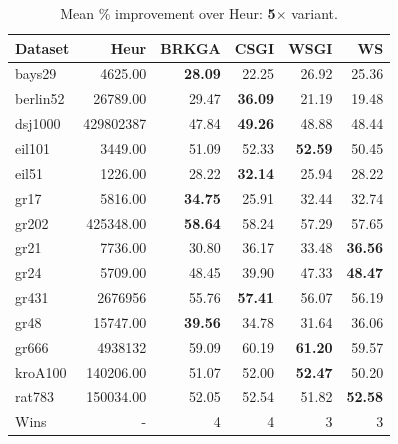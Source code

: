 \documentclass[sigconf]{acmart}
\begin{document}
\begin{table}[t]
\centering
\caption{Mean \% improvement over Heur: \textbf{5$\times$} variant.}
\label{tab:5x}
\small
\begin{tabular}{lrrrrr}
\toprule
Dataset & Heur & BRKGA & CSGI & WSGI & WS \\
\midrule
bays29 & 4625.00 & \textbf{28.09} & 22.25 & 26.92 & 25.36 \\
berlin52 & 26789.00 & 29.47 & \textbf{36.09} & 21.19 & 19.48 \\
dsj1000 & 429802387 & 47.84 & \textbf{49.26} & 48.88 & 48.44 \\
eil101 & 3449.00 & 51.09 & 52.33 & \textbf{52.59} & 50.45 \\
eil51 & 1226.00 & 28.22 & \textbf{32.14} & 25.94 & 28.22 \\
gr17 & 5816.00 & \textbf{34.75} & 25.91 & 32.44 & 32.74 \\
gr202 & 425348.00 & \textbf{58.64} & 58.24 & 57.29 & 57.65 \\
gr21 & 7736.00 & 30.80 & 36.17 & 33.48 & \textbf{36.56} \\
gr24 & 5709.00 & 48.45 & 39.90 & 47.33 & \textbf{48.47} \\
gr431 & 2676956 & 55.76 & \textbf{57.41} & 56.07 & 56.19 \\
gr48 & 15747.00 & \textbf{39.56} & 34.78 & 31.64 & 36.06 \\
gr666 & 4938132 & 59.09 & 60.19 & \textbf{61.20} & 59.57 \\
kroA100 & 140206.00 & 51.07 & 52.00 & \textbf{52.47} & 50.20 \\
rat783 & 150034.00 & 52.05 & 52.54 & 51.82 & \textbf{52.58} \\
\midrule
Wins & - & 4 & 4 & 3 & 3 \\
\bottomrule
\end{tabular}
\end{table}
\end{document}
